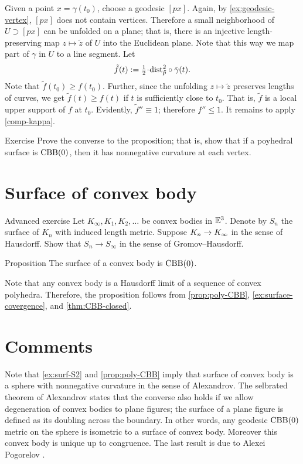 Given a point $x=\gamma(t_0)$, choose a geodesic $[px]$.
Again, by \ref{ex:geodesic-vertex}, $[px]$ does not contain vertices.
Therefore a small neighborhood of $U\supset [px]$ can be unfolded on a plane;
that is, there is an injective length-preserving map $z\mapsto \tilde z$
of $U$ into the Euclidean plane.
Note that this way we map part of $\gamma$ in $U$ to a line segment.
Let 
\[\tilde f(t)\df\tfrac12\cdot\distfun_{\tilde p}^2\circ\tilde \gamma(t).\]
Note that $\tilde f(t_0)\ge f(t_0)$.
Further, since the unfolding $z\mapsto \tilde z$ preserves lengths of curves, we get 
$\tilde f(t)\ge f(t)$ if $t$ is sufficiently close to $t_0$.
That is, $\tilde f$ is a local upper support of $f$ at $t_0$.
Evidently, $\tilde f''\equiv 1$; therefore $f''\le 1$.
It remains to apply \ref{comp-kappa}.
\qeds

\begin{thm}{Exercise}\label{ex:poly-CBB}
Prove the converse to the proposition;
that is, show that if a poyhedral surface is $\mathrm{CBB}(0)$, then it has nonnegative curvature at each vertex.
\end{thm}

\section{Surface of convex body}

\begin{thm}{Advanced exercise}\label{ex:surface-covergence}
Let $K_\infty,K_1,K_2,\dots$ be convex bodies in $\mathbb{E}^3$.
Denote by $S_n$ the surface of $K_n$ with induced length metric.
Suppose $K_n\z\to K_\infty$ in the sense of Hausdorff.
Show that $S_n\to S_\infty$ in the sense of Gromov--Hausdorff.
\end{thm}

\begin{thm}{Proposition}\label{prop:conv-surf-CBB(0)}
The surface of a convex body is $\mathrm{CBB}(0)$.
\end{thm}

Note that any convex body is a Hausdorff limit of a sequence of convex polyhedra.
Therefore, the proposition follows from \ref{prop:poly-CBB}, \ref{ex:surface-covergence}, and \ref{thm:CBB-closed}.

\section{Comments}

Note that \ref{ex:surf-S2} and \ref{prop:poly-CBB} imply that surface of convex body is a sphere with nonnegative curvature in the sense of Alexandrov.
The selbrated theorem of Alexandrov states that the converse also holds if we allow degeneration of convex bodies to plane figures;
the surface of a plane figure is defined as its doubling across the boundary.
In other words, any geodesic $\mathrm{CBB}(0)$ metric on the sphere is isometric to a surface of convex body.
Moreover this convex body is unique up to congruence.
The last result is due to Alexei Pogorelov \cite{pogorelov}.

